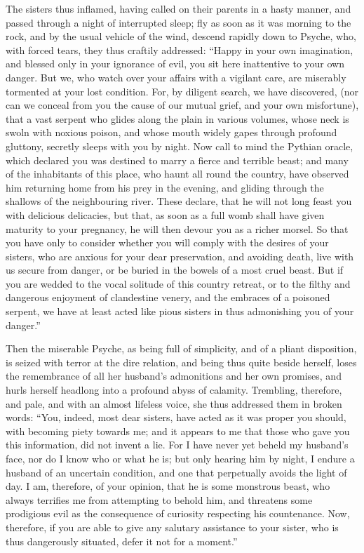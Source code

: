 \documentclass[12pt]{article}
\begin{document}
The sisters thus inflamed, having called on their parents in a hasty manner,
and passed through a night of interrupted sleep; fly as soon as it was morning
to the rock, and by the usual vehicle of the wind, descend rapidly down to
Psyche, who, with forced tears, they thus craftily addressed: ``Happy in your
own imagination, and blessed only in your ignorance of evil, you sit here
inattentive to your own danger. But we, who watch over your affairs with a
vigilant care, are miserably tormented at your lost condition. For, by diligent
search, we have discovered, (nor can we conceal from you the cause of our
mutual grief, and your own misfortune), that a vast serpent who glides along
the plain in various volumes, whose neck is swoln with noxious poison, and
whose mouth widely gapes through profound gluttony, secretly sleeps with you by
night. Now call to mind the Pythian oracle, which declared you was destined to
marry a fierce and terrible beast; and many of the inhabitants of this place,
who haunt all round the country, have observed him returning home from his prey
in the evening, and gliding through the shallows of the neighbouring river.
These declare, that he will not long feast you with delicious delicacies, but
that, as soon as a full womb shall have given maturity to your pregnancy, he
will then devour you as a richer morsel. So that you have only to consider
whether you will comply with the desires of your sisters, who are anxious for
your dear preservation, and avoiding death, live with us secure from danger, or
be buried in the bowels of a most cruel beast. But if you are wedded to the
vocal solitude of this country retreat, or to the filthy and dangerous
enjoyment of clandestine venery, and the embraces of a poisoned serpent, we
have at least acted like pious sisters in thus admonishing you of your
danger.''

Then the miserable Psyche, as being full of simplicity, and of a pliant
disposition, is seized with terror at the dire relation, and being thus quite
beside herself, loses the remembrance of all her husband's admonitions and her
own promises, and hurls herself headlong into a profound abyss of calamity.
Trembling, therefore, and pale, and with an almost lifeless voice, she thus
addressed them in broken words: ``You, indeed, most dear sisters, have acted as
it was proper you should, with becoming piety towards me; and it appears to me
that those who gave you this information, did not invent a lie. For I have
never yet beheld my husband's face, nor do I know who or what he is; but only
hearing him by night, I endure a husband of an uncertain condition, and one
that perpetually avoids the light of day. I am, therefore, of your opinion,
that he is some monstrous beast, who always terrifies me from attempting to
behold him, and threatens some prodigious evil as the consequence of curiosity
respecting his countenance. Now, therefore, if you are able to give any
salutary assistance to your sister, who is thus dangerously situated, defer it
not for a moment.''
\end{document}
